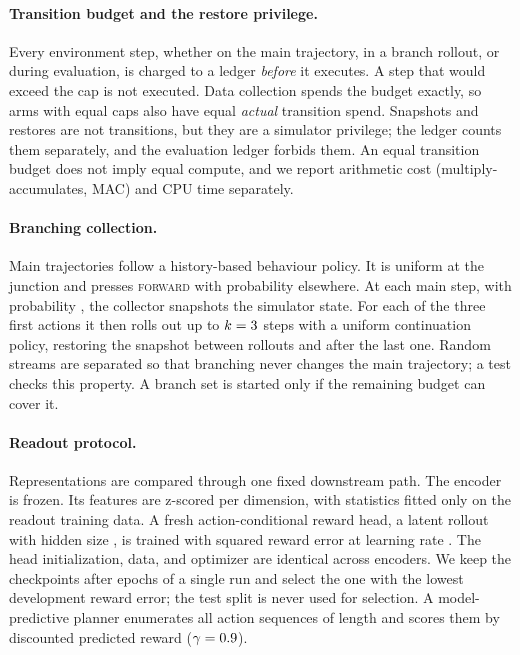 \paragraph{Transition budget and the restore privilege.}
Every environment step, whether on the main trajectory, in a branch rollout, or during evaluation, is charged to a ledger \emph{before} it executes. A step that would exceed the cap is not executed. Data collection spends the budget exactly, so arms with equal caps also have equal \emph{actual} transition spend. Snapshots and restores are not transitions, but they are a simulator privilege; the ledger counts them separately, and the evaluation ledger forbids them. An equal transition budget does not imply equal compute, and we report arithmetic cost (multiply-accumulates, MAC) and CPU time separately.

\paragraph{Branching collection.}
Main trajectories follow a history-based behaviour policy. It is uniform at the junction and presses \textsc{forward} with probability \DiagCfgForwardProb{} elsewhere. At each main step, with probability \DiagCfgBranchProb{}, the collector snapshots the simulator state. For each of the three first actions it then rolls out up to $k=3$ steps with a uniform continuation policy, restoring the snapshot between rollouts and after the last one. Random streams are separated so that branching never changes the main trajectory; a test checks this property. A branch set is started only if the remaining budget can cover it.

\paragraph{Readout protocol.}
Representations are compared through one fixed downstream path. The encoder is frozen. Its features are z-scored per dimension, with statistics fitted only on the readout training data. A fresh action-conditional reward head, a latent rollout with hidden size \DiagCfgHidden, is trained with squared reward error at learning rate \DiagCfgHeadLR. The head initialization, data, and optimizer are identical across encoders. We keep the checkpoints after \DiagCfgHeadEpochs{} epochs of a single run and select the one with the lowest development reward error; the test split is never used for selection. A model-predictive planner enumerates all action sequences of length \DiagCfgPlanHorizon{} and scores them by discounted predicted reward ($\gamma=0.9$).

